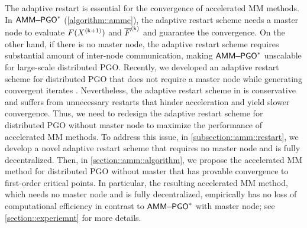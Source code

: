 {
	\highlight
	The adaptive restart is essential for the convergence of accelerated MM methods. In  $\mathsf{AMM\!\!-\!\!PGO}^*$  (\cref{algorithm::ammc}), the adaptive restart scheme needs a master node to evaluate $F(X^{(\mathsf{k}+1)})$ and $\overline{F}^{(\mathsf{k})}$ and guarantee the convergence. On the other hand, if there is no master node, the adaptive restart scheme requires substantial amount of inter-node communication, making  $\mathsf{AMM\!\!-\!\!PGO}^*$  unscalable for large-scale distributed PGO. Recently, we developed an adaptive restart scheme for distributed PGO that does not require a master node while generating convergent iterates \cite{fan2020mm}.  Nevertheless, the adaptive restart scheme in \cite{fan2020mm}  is conservative and suffers from unnecessary restarts that hinder acceleration and yield slower convergence. Thus, we need to redesign the adaptive restart scheme for distributed PGO without master node to maximize the performance of accelerated MM methods. To address this issue, in \cref{subsection::amm::restart}, we develop a novel adaptive restart scheme that requires no master node and is fully decentralized. Then, in \cref{section::amm::algorithm}, we propose the accelerated MM method for distributed PGO without master that has provable convergence to first-order critical points. In particular, the resulting accelerated MM method, which needs no master node and is fully decentralized, empirically has no loss of computational efficiency in contrast to  $\mathsf{AMM\!\!-\!\!PGO}^*$  with master node; see \cref{section::experiemnt} for more details. 
}

\vspace{-0.75em}
